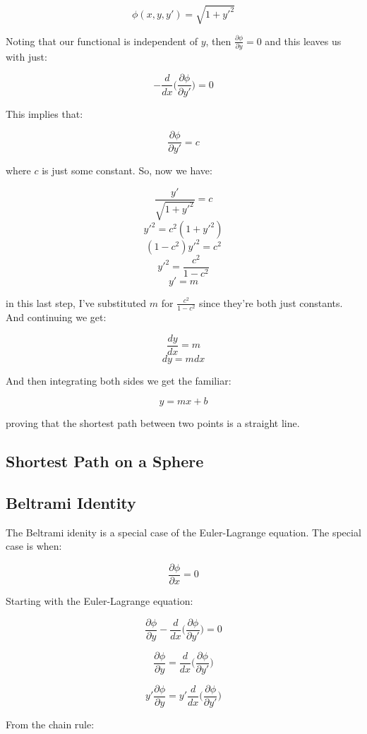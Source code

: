 \documentclass{article}
\begin{document}
$$\phi( x, y, y' ) = \sqrt{ 1 + y'^2 }$$

Noting that our functional is independent of $y$, then $\frac{ \partial \phi }{ \partial y } = 0$ and this leaves us with just:

$$-\frac{ d }{ dx } \Big( \frac{ \partial \phi }{ \partial y' } \Big) = 0$$

This implies that:

$$\frac{ \partial \phi }{ \partial y' } = c$$

where $c$ is just some constant.  So, now we have:

$$\frac{ y' }{ \sqrt{ 1 + y'^2 } } = c$$
$$y'^2 = c^2 ( 1 + y'^2 )$$
$$( 1 - c^2 )y'^2 = c^2$$
$$y'^2 = \frac{ c^2 }{ 1 - c^2 }$$
$$y' = m$$

in this last step, I've substituted $m$ for $\frac{ c^2 }{ 1 - c^2 }$ since they're both just constants.  And continuing we get:

$$\frac{ dy }{ dx } = m$$
$$dy = m dx$$

And then integrating both sides we get the familiar:

$$y = mx + b$$

proving that the shortest path between two points is a straight line.


%
%
%
\subsection{Shortest Path on a Sphere}


%
%
%
\subsection{Beltrami Identity}

The Beltrami idenity is a special case of the Euler-Lagrange equation.  The special case is when:

$$\frac{ \partial \phi }{ \partial x } = 0$$

Starting with the Euler-Lagrange equation:

$$\frac{ \partial \phi }{ \partial y } - \frac{ d }{ dx } \Big( \frac{ \partial \phi }{ \partial y' } \Big)= 0$$

$$\frac{ \partial \phi }{ \partial y } = \frac{ d }{ dx } \Big( \frac{ \partial \phi }{ \partial y' } \Big)$$

$$y' \frac{ \partial \phi }{ \partial y } = y' \frac{ d }{ dx } \Big( \frac{ \partial \phi }{ \partial y' } \Big)$$

From the chain rule:
\end{document}
